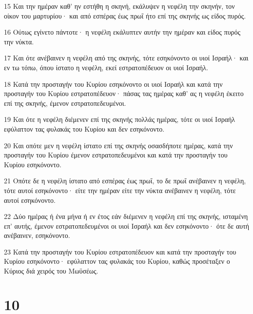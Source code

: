 \par 15 Και την ημέραν καθ' ην εστήθη η σκηνή, εκάλυψεν η νεφέλη την σκηνήν, τον οίκον του μαρτυρίου· και από εσπέρας έως πρωΐ ήτο επί της σκηνής ως είδος πυρός.
\par 16 Ούτως εγίνετο πάντοτε· η νεφέλη εκάλυπτεν αυτήν την ημέραν και είδος πυρός την νύκτα.
\par 17 Και ότε ανέβαινεν η νεφέλη από της σκηνής, τότε εσηκόνοντο οι υιοί Ισραήλ· και εν τω τόπω, όπου ίστατο η νεφέλη, εκεί εστρατοπέδευον οι υιοί Ισραήλ.
\par 18 Κατά την προσταγήν του Κυρίου εσηκόνοντο οι υιοί Ισραήλ και κατά την προσταγήν του Κυρίου εστρατοπέδευον· πάσας τας ημέρας καθ' ας η νεφέλη έκειτο επί της σκηνής, έμενον εστρατοπεδευμένοι.
\par 19 Και ότε η νεφέλη διέμενεν επί της σκηνής πολλάς ημέρας, τότε οι υιοί Ισραήλ εφύλαττον τας φυλακάς του Κυρίου και δεν εσηκόνοντο.
\par 20 Και οπότε μεν η νεφέλη ίστατο επί της σκηνής οσασδήποτε ημέρας, κατά την προσταγήν του Κυρίου έμενον εστρατοπεδευμένοι και κατά την προσταγήν του Κυρίου εσηκόνοντο.
\par 21 Οπότε δε η νεφέλη ίστατο από εσπέρας έως πρωΐ, το δε πρωΐ ανέβαινεν η νεφέλη, τότε αυτοί εσηκόνοντο· είτε την ημέραν είτε την νύκτα ανέβαινεν η νεφέλη, τότε αυτοί εσηκόνοντο.
\par 22 Δύο ημέρας ή ένα μήνα ή εν έτος εάν διέμενεν η νεφέλη επί της σκηνής, ισταμένη επ' αυτής, έμενον εστρατοπεδευμένοι οι υιοί Ισραήλ και δεν εσηκόνοντο· ότε δε αυτή ανέβαινεν, εσηκόνοντο.
\par 23 Κατά την προσταγήν του Κυρίου εστρατοπέδευον και κατά την προσταγήν του Κυρίου εσηκόνοντο· εφύλαττον τας φυλακάς του Κυρίου, καθώς προσέταξεν ο Κύριος διά χειρός του Μωϋσέως.

\chapter{10}

